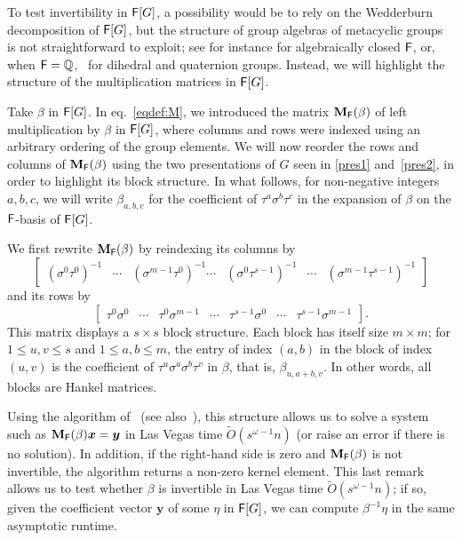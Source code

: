 To test invertibility in ${\mathsf{F}}[G]$, a possibility would be to rely on
the Wedderburn decomposition of ${\mathsf{F}}[G]$, but the structure of group
algebras of metacyclic groups is not straightforward to exploit; see
for instance \citep[\S 47]{Curtis} for algebraically closed ${\mathsf{F}}$, or,
when ${\mathsf{F}}=\mathbb{Q}$,~\citep{Decomposition} for dihedral and quaternion
groups. Instead, we will highlight the structure of the multiplication
matrices in ${\mathsf{F}}[G]$.

Take $\beta$ in ${\mathsf{F}}[G]$. In eq.~\eqref{eqdef:M}, we introduced the
matrix $\mat M_\F(\beta)$ of left multiplication by $\beta$ in
${\mathsf{F}}[G]$, where columns and rows were indexed using an arbitrary ordering
of the group elements. We will now reorder the rows and columns of
$\mat M_\F(\beta)$ using the two presentations of $G$ seen in
\eqref{pres1} and~\eqref{pres2}, in order to highlight its block structure.
In what follows, for non-negative integers $a,b,c$, we will write
$\beta_{a,b,c}$ for the coefficient of $\tau^a \sigma^b \tau^c$ in the
expansion of $\beta$ on the ${\mathsf{F}}$-basis of ${\mathsf{F}}[G]$.

We first rewrite $\mat M_\F(\beta)$ by reindexing its columns
by 
$$\begin{bmatrix}
(\sigma^0 \tau^0)^{-1} &  \cdots & (\sigma^{m-1} \tau^0)^{-1} \cdots& (\sigma^0 \tau^{s-1})^{-1} &  \cdots & (\sigma^{m-1} \tau^{s-1})^{-1} 
\end{bmatrix}$$
and its rows by
$$\begin{bmatrix}
\tau^0 \sigma^0 & \cdots & \tau^0 \sigma^{m-1} & \cdots& \tau^{s-1} \sigma^0 & \cdots&  \tau^{s-1} \sigma^{m-1}
\end{bmatrix}.
$$ This matrix displays a $s \times s$
block structure. Each block has itself size $m \times m$; for $1 \le
u,v \le s$ and $1 \le a,b \le m$, the entry of index $(a,b)$ in the
block of index $(u,v)$ is the coefficient of $\tau^u \sigma^a \sigma^b
\tau^v$ in $\beta$, that is, $\beta_{u,a+b,v}$. In other words,
all blocks are Hankel matrices.

Using the algorithm of~\cite{BoJeMoSc17} (see
also~\citep[Appendix~A]{EbGiGiSVi07}), this structure allows us to
solve a system such as $\mat M_\F(\beta) \boldsymbol x = \boldsymbol
y$ in Las Vegas time $\tilde{O}(s^{\omega-1} n)$ (or raise an error if
there is no solution). In addition, if the right-hand side is zero and
$\mat M_\F(\beta)$ is not invertible, the algorithm returns a non-zero
kernel element.
This last remark allows us to test whether $\beta$ is invertible in
Las Vegas time $\tilde{O}(s^{\omega-1} n)$; if so, given the
coefficient vector $\boldsymbol y$ of some $\eta$ in ${\mathsf{F}}[G]$, we can
compute $\beta^{-1} \eta$ in the same asymptotic runtime.


